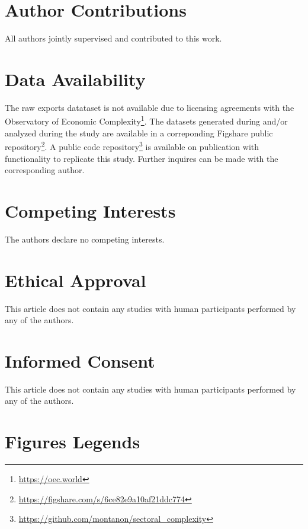 \documentclass[10pt]{article}
\begin{document}

      

\newpage

\section{Author Contributions}
All authors jointly supervised and contributed to this work.

\section{Data Availability}
The raw exports datataset is not available due to licensing agreements with the Observatory of Economic Complexity\footnote{\url{https://oec.world}}. 
The datasets generated during and/or analyzed during the study are available in a correponding Figshare public repository\footnote{\url{https://figshare.com/s/6ce82e9a10af21ddc774}}. A public code repository\footnote{\url{https://github.com/montanon/sectoral_complexity}} is available on publication with functionality to replicate this study. Further inquires can be made with the corresponding author.

\section{Competing Interests}
The authors declare no competing interests.

\section{Ethical Approval}
This article does not contain any studies with human participants performed by any of the authors.

\section{Informed Consent}
This article does not contain any studies with human participants performed by any of the authors.

\section{Figures Legends}
\end{document}
